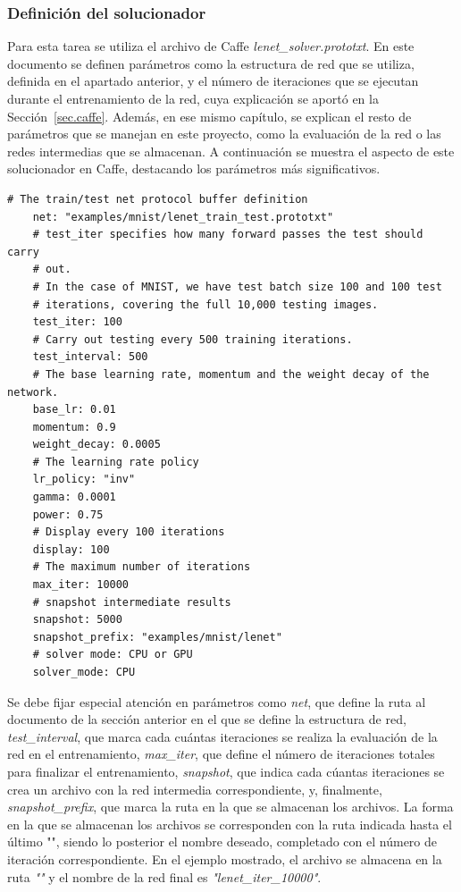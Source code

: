 \subsubsection{Definición del solucionador}
	Para esta tarea se utiliza el archivo de Caffe \textit{lenet\_solver.prototxt}. En este documento se definen parámetros como la estructura de red que se utiliza, definida en el apartado anterior, y el número de iteraciones que se ejecutan durante el entrenamiento de la red, cuya explicación se aportó en la Sección~\ref{sec.caffe}. Además, en ese mismo capítulo, se explican el resto de parámetros que se manejan en este proyecto, como la evaluación de la red o las redes intermedias que se almacenan. A continuación se muestra el aspecto de este solucionador en Caffe, destacando los parámetros más significativos.
	\vspace{80pt}
	\begin{lstlisting}[frame=single]
	# The train/test net protocol buffer definition
	net: "examples/mnist/lenet_train_test.prototxt"
	# test_iter specifies how many forward passes the test should carry 
	# out.
	# In the case of MNIST, we have test batch size 100 and 100 test
	# iterations, covering the full 10,000 testing images.
	test_iter: 100
	# Carry out testing every 500 training iterations.
	test_interval: 500
	# The base learning rate, momentum and the weight decay of the network.
	base_lr: 0.01
	momentum: 0.9
	weight_decay: 0.0005
	# The learning rate policy
	lr_policy: "inv"
	gamma: 0.0001
	power: 0.75
	# Display every 100 iterations
	display: 100
	# The maximum number of iterations
	max_iter: 10000
	# snapshot intermediate results
	snapshot: 5000
	snapshot_prefix: "examples/mnist/lenet"
	# solver mode: CPU or GPU
	solver_mode: CPU	
	\end{lstlisting}
	
	Se debe fijar especial atención en parámetros como \textit{net}, que define la ruta al documento de la sección anterior en el que se define la estructura de red, \textit{test\_interval}, que marca cada cuántas iteraciones se realiza la evaluación de la red en el entrenamiento, \textit{max\_iter}, que define el número de iteraciones totales para finalizar el entrenamiento, \textit{snapshot}, que indica cada cúantas iteraciones se crea un archivo con la red intermedia correspondiente, y, finalmente, \textit{snapshot\_prefix}, que marca la ruta en la que se almacenan los archivos. La forma en la que se almacenan los archivos se corresponden con la ruta indicada hasta el último "\text{/}", siendo lo posterior el nombre deseado, completado con el número de iteración correspondiente. En el ejemplo mostrado, el archivo se almacena en la ruta \textit{""}    y el nombre de la red final es \textit{"lenet\_iter\_10000"}.\\
	
